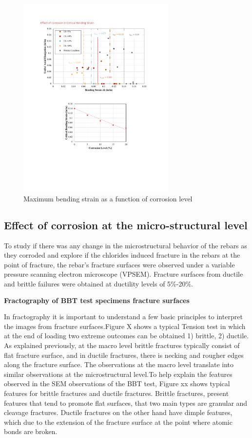 \begin{figure}[htbp]
	\centering
	\includegraphics[width=0.7\textwidth]{VAC Thesis 2.0/Chapter-4/figs/BBT_results_summary.pdf}
	\caption{Maximum bending strain as a function of corrosion level}
	\label{fig:eb_vs_CL}
\end{figure}

\subsection{Effect of corrosion at the micro-structural level}

To study if there was any change in the microstructural behavior of the rebars as they corroded and explore if the chlorides induced fracture in the rebars at the point of fracture, the rebar's fracture surfaces were observed under a variable pressure scanning electron microscope (VPSEM). Fracture surfaces from ductile and brittle failures were obtained at ductility levels of 5\%-20\%.

\textbf{Fractography of BBT test specimens fracture surfaces}

In fractography it is important to understand a few basic principles to interpret the images from fracture surfaces.Figure X shows a typical Tension test in which at the end of loading two extreme outcomes can be obtained 1) brittle, 2) ductile. As explained previously, at the macro level brittle fractures typically consist of flat fracture surface, and in ductile fractures, there is necking and rougher edges along the fracture surface. The observations at the macro level translate into similar observations at the microstructural level.To help explain the features observed in the SEM observations of the BBT test, Figure xx shows typical features for brittle fractures and ductile fractures. Brittle fractures, present features that tend to promote flat surfaces, that two main types are granular and cleavage fractures. Ductile fractures on the other hand have dimple features, which due to the extension of the fracture surface at the point where atomic bonds are broken.

